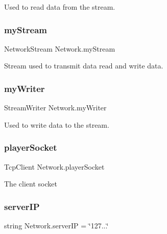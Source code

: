 Used to read data from the stream. 

\mbox{\label{class_network_ac9848301f17c819897dc89fce29b8e6a}} 
\subsubsection{\texorpdfstring{myStream}{myStream}}
{\footnotesize\ttfamily Network\+Stream Network.\+my\+Stream\hspace{0.3cm}{\ttfamily [static]}}



Stream used to transmit data read and write data. 

\mbox{\label{class_network_a1fa8240fd7edc4368301ad87f2c1ebf5}} 
\subsubsection{\texorpdfstring{myWriter}{myWriter}}
{\footnotesize\ttfamily Stream\+Writer Network.\+my\+Writer}



Used to write data to the stream. 

\mbox{\label{class_network_ab009762179a0fc5916b8bebeb8f0a32f}} 
\subsubsection{\texorpdfstring{playerSocket}{playerSocket}}
{\footnotesize\ttfamily Tcp\+Client Network.\+player\+Socket}



The client socket 

\mbox{\label{class_network_a7b66965653988950efaf3ec4de0f6cdd}} 
\subsubsection{\texorpdfstring{serverIP}{serverIP}}
{\footnotesize\ttfamily string Network.\+server\+IP = \char`\"{}127...\char`\"{}}



